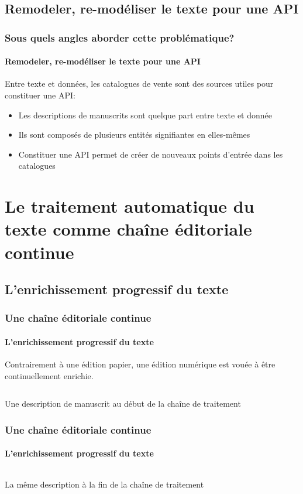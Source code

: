\documentclass{beamer}
\begin{document}
\subsection{Remodeler, re-modéliser le texte pour une API}
\begin{frame}
	\frametitle{Sous quels angles aborder cette problématique?}
	\framesubtitle{Remodeler, re-modéliser le texte pour une API}
	
	Entre texte et données, les catalogues de vente sont des sources utiles pour constituer une API:
	\begin{itemize}
		\item Les descriptions de manuscrits sont quelque part entre texte et donnée
		\item Ils sont composés de plusieurs entités signifiantes en elles-mêmes
		\item Constituer une API permet de créer de nouveaux points d'entrée dans les catalogues
	\end{itemize}
\end{frame}

\section{Le traitement automatique du texte comme chaîne éditoriale continue}
\subsection{L'enrichissement progressif du texte}
\begin{frame}
	\frametitle{Une chaîne éditoriale continue}
	\framesubtitle{L'enrichissement progressif du texte}
	
	Contrairement à une édition papier, une édition numérique est vouée à être continuellement enrichie.
	\begin{listing}[h]
		\centering
		\inputminted{xml}{includes/tei_item_simple.xml}
		\caption{Une description de manuscrit au début de la chaîne de traitement}
	\end{listing}
\end{frame}

\begin{frame}
	\frametitle{Une chaîne éditoriale continue}
	\framesubtitle{L'enrichissement progressif du texte}
	
	\begin{listing}[h]
		\centering
		\inputminted{xml}{includes/tei_item.xml}
		\caption{La même description à la fin de la chaîne de traitement}
	\end{listing}
\end{frame}
\end{document}
